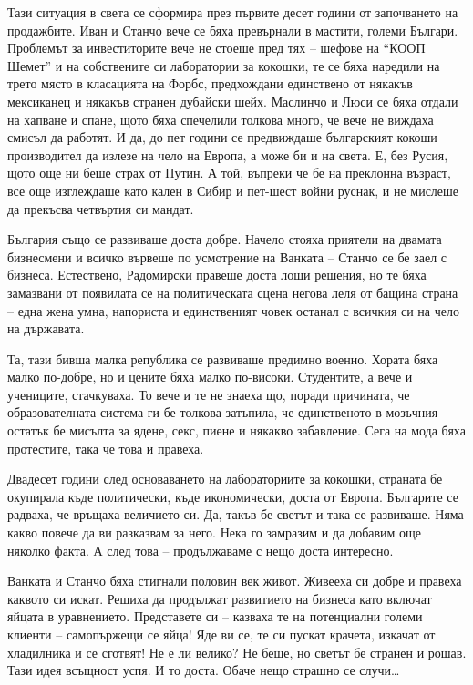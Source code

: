 \documentclass[ebook,openany,12pt]{memoir}
\begin{document}
Тази ситуация в света се сформира през първите десет години от започването на продажбите. Иван и Станчо вече се бяха превърнали в мастити, големи Българи. Проблемът за инвеститорите вече не стоеше пред тях – шефове на ``КООП Шемет'' и на собствените си лаборатории за кокошки, те се бяха наредили на трето място в класацията на Форбс, предхождани единствено от някакъв мексиканец и някакъв странен дубайски шейх. Маслинчо и Люси се бяха отдали на хапване и спане, щото бяха спечелили толкова много, че вече не виждаха смисъл да работят. И да, до пет години се предвиждаше българският кокоши производител да излезе на чело на Европа, а може би и на света. Е, без Русия, щото още ни беше страх от Путин. А той, въпреки че бе на преклонна възраст, все още изглеждаше като кален в Сибир и пет-шест войни руснак, и не мислеше да прекъсва четвъртия си мандат.

България също се развиваше доста добре. Начело стояха приятели на двамата бизнесмени и всичко вървеше по усмотрение на Ванката -- Станчо се бе заел с бизнеса. Естествено, Радомирски правеше доста лоши решения, но те бяха замазвани от появилата се на политическата сцена негова леля от бащина страна – една жена умна, напориста и единственият човек останал с всичкия си на чело на държавата.

Та, тази бивша малка република се развиваше предимно военно. Хората бяха малко по-добре, но и цените бяха малко по-високи. Студентите, а вече и учениците, стачкуваха. То вече и те не знаеха що, поради причината, че образователната система ги бе толкова затъпила, че единственото в мозъчния остатък бе мисълта за ядене, секс, пиене и някакво забавление. Сега на мода бяха протестите, така че това и правеха.

Двадесет години след основаването на лабораториите за кокошки, страната бе окупирала къде политически, къде икономически, доста от Европа. Българите се радваха, че връщаха величието си. Да, такъв бе светът и така се развиваше. Няма какво повече да ви разказвам за него. Нека го замразим и да добавим още няколко факта. А след това – продължаваме с нещо доста интересно.

Ванката и Станчо бяха стигнали половин век живот. Живееха си добре и правеха каквото си искат. Решиха да продължат развитието на бизнеса като включат яйцата в уравнението. Представете си – казваха те на потенциални големи клиенти – самопържещи се яйца! Яде ви се, те си пускат крачета, изкачат от хладилника и се сготвят! Не е ли велико? Не беше, но светът бе странен и рошав. Тази идея всъщност успя. И то доста. Обаче нещо страшно се случи\ldots
\end{document}

